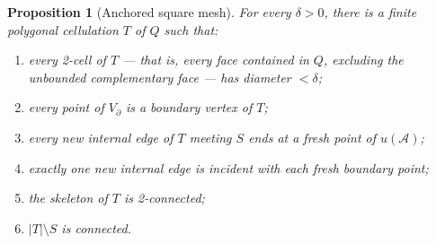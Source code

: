 \documentclass[11pt]{article}
\theoremstyle{mainplain}
\theoremstyle{mainroman}
\newtheorem{longproposition}[theorem]{Proposition}
\theoremstyle{definition}
\providecommand{\tightlist}{\setlength{\itemsep}{0pt}\setlength{\parskip}{0pt}}
\numberwithin{equation}{section}
\begin{document}
\begin{longproposition}[Anchored square mesh]\label{prop:anchored-square-mesh}
For every \(\delta>0\), there is a finite polygonal cellulation \(T\) of \(Q\) such that:

\begin{enumerate}
\def\labelenumi{\arabic{enumi}.}
\tightlist
\item
  every 2-cell of \(T\) --- that is, every face contained in \(Q\),
  excluding the unbounded complementary face --- has diameter
  \(<\delta\);
\item
  every point of \(V_\partial\) is a boundary vertex of \(T\);
\item
  every new internal edge of \(T\) meeting \(S\) ends at a fresh point of \(u(\mathcal A)\);
\item
  exactly one new internal edge is incident with each fresh boundary point;
\item
  the skeleton of \(T\) is 2-connected;
\item
  \(|T|\setminus S\) is connected.
\end{enumerate}
\end{longproposition}
\end{document}
